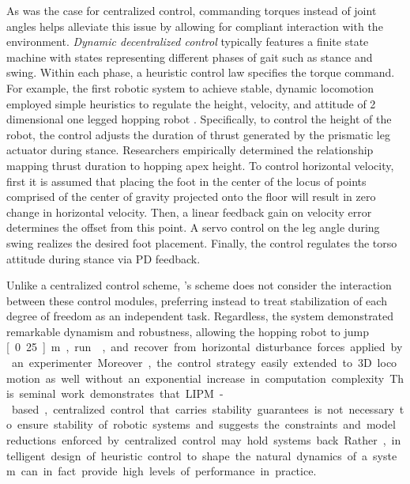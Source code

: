 As was the case for centralized control, commanding torques instead of joint
angles helps alleviate this issue by allowing for compliant interaction with the
environment. \emph{Dynamic decentralized control} typically features a finite
state machine with states representing different phases of gait such as stance
and swing. Within each phase, a heuristic control law specifies the torque
command. For example, the first robotic system to achieve stable, dynamic
locomotion employed simple heuristics to regulate the height, velocity, and
attitude of 2 dimensional one legged hopping robot
\citep{raibert1983dynamically}. Specifically, to control the height of the
robot, the control adjusts the duration of thrust generated by the prismatic leg
actuator during stance. Researchers empirically determined the relationship
mapping thrust duration to hopping apex height. To control horizontal velocity,
first it is assumed that placing the foot in the center of the locus of points
comprised of the center of gravity projected onto the floor will result in zero
change in horizontal velocity. Then, a linear feedback gain on velocity error
determines the offset from this point. A servo control on the leg angle during
swing realizes the desired foot placement. Finally, the control regulates the
torso attitude during stance via PD feedback. 

Unlike a centralized control scheme, \citeauthor{raibert1983dynamically}'s
scheme does not consider the interaction between these control modules,
preferring instead to treat stabilization of each degree of freedom as an
independent task. Regardless, the system demonstrated remarkable dynamism and
robustness, allowing the hopping robot to jump \unit[0.25]{m}, run
, and recover from horizontal disturbance forces applied by
an experimenter. Moreover, the control strategy easily extended to 3D locomotion
as well without an exponential increase in computation complexity. This seminal
work demonstrates that LIPM-based, centralized control that carries stability
guarantees is not necessary to ensure stability of robotic systems and suggests
the constraints and model reductions enforced by centralized control may hold
systems back. Rather, intelligent design of heuristic control to shape the
natural dynamics of a system can in fact provide high levels of performance in
practice.

